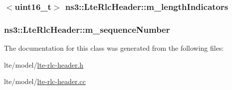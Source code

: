 \subsubsection[{\texorpdfstring{m\+\_\+length\+Indicators}{m_lengthIndicators}}]{$<$uint16\+\_\+t$>$ ns3\+::\+Lte\+Rlc\+Header\+::m\+\_\+length\+Indicators\hspace{0.3cm}{\ttfamily [private]}}\hypertarget{classns3_1_1LteRlcHeader_a7cc563904c11ad15d6e859521223ec46}{}\label{classns3_1_1LteRlcHeader_a7cc563904c11ad15d6e859521223ec46}
\subsubsection[{\texorpdfstring{m\+\_\+sequence\+Number}{m_sequenceNumber}}]{ ns3\+::\+Lte\+Rlc\+Header\+::m\+\_\+sequence\+Number\hspace{0.3cm}{\ttfamily [private]}}\hypertarget{classns3_1_1LteRlcHeader_a345256a1a41193cae2f08b9918e438fc}{}\label{classns3_1_1LteRlcHeader_a345256a1a41193cae2f08b9918e438fc}


The documentation for this class was generated from the following files\+:\begin{DoxyCompactItemize}
\item 
lte/model/\hyperlink{lte-rlc-header_8h}{lte-\/rlc-\/header.\+h}\item 
lte/model/\hyperlink{lte-rlc-header_8cc}{lte-\/rlc-\/header.\+cc}\end{DoxyCompactItemize}
